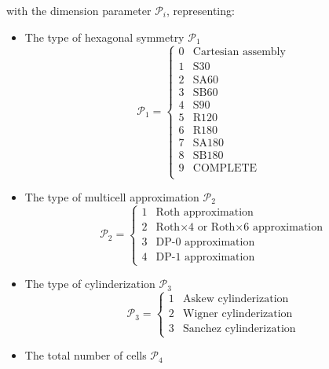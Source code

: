 \noindent
with the dimension parameter $\mathcal{P}_{i}$, representing:

\begin{itemize}

\item The type of hexagonal symmetry $\mathcal{P}_{1}$
\begin{displaymath}
\mathcal{P}_{1} = \left\{
\begin{array}{rl}
 0 & \textrm{Cartesian assembly} \\
 1 & \textrm{S30} \\
 2 & \textrm{SA60} \\
 3 & \textrm{SB60} \\
 4 & \textrm{S90} \\
 5 & \textrm{R120} \\
 6 & \textrm{R180} \\
 7 & \textrm{SA180} \\
 8 & \textrm{SB180} \\
 9 & \textrm{COMPLETE} \\
\end{array} \right.
\end{displaymath}

\item The type of multicell approximation $\mathcal{P}_{2}$
\begin{displaymath}
\mathcal{P}_{2} = \left\{
\begin{array}{ll}
1 & \textrm{Roth approximation}\\
2 & \textrm{Roth$\times 4$ or Roth$\times 6$ approximation}\\
3 & \textrm{DP-0 approximation}\\
4 & \textrm{DP-1 approximation} \end{array} \right.
\end{displaymath}

\item The type of cylinderization $\mathcal{P}_{3}$
\begin{displaymath}
\mathcal{P}_{3} = \left\{
\begin{array}{ll}
1 & \textrm{Askew cylinderization}\\
2 & \textrm{Wigner cylinderization}\\
3 & \textrm{Sanchez cylinderization} \end{array} \right.
\end{displaymath}

\item The total number of cells $\mathcal{P}_{4}$


\end{itemize}
